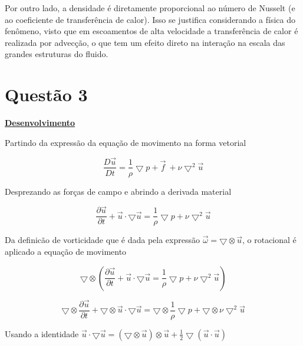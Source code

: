 \documentclass[12pt]{article}
\begin{document}
Por outro lado, a densidade é diretamente proporcional ao número de Nusselt (e ao coeficiente de transferência de calor). Isso se justifica considerando a física do fenômeno, visto que em escoamentos de alta velocidade a transferência de calor é realizada por advecção, o que tem um efeito direto na interação na escala das grandes estruturas do fluido.


\section*{Questão 3}

\textbf{\underline{Desenvolvimento}}


Partindo da expressão da equação de movimento na forma vetorial

\begin{equation}
	\frac{D\vec{u}}{Dt} = \frac{1}{\rho} \bigtriangledown p + \vec{f} \ + \nu \bigtriangledown^2 \vec{u}
\end{equation}


Desprezando as forças de campo e abrindo a derivada material


\begin{equation}
	\frac{\partial \vec{u}}{\partial t} + \vec{u} \cdot \bigtriangledown \vec{u} = \frac{1}{\rho} \bigtriangledown p + \nu \bigtriangledown^2 \vec{u}
\end{equation}


Da definicão de vorticidade que é dada pela expressão $\vec{\omega} = \bigtriangledown \otimes \vec{u}$, o rotacional é aplicado a equação de movimento

\begin{equation}
	\bigtriangledown \otimes \left( \frac{\partial \vec{u}}{\partial t} + \vec{u} \cdot \bigtriangledown \vec{u} = \frac{1}{\rho} \bigtriangledown p + \nu \bigtriangledown^2 \vec{u}\right) 
\end{equation}

\begin{equation}
	\bigtriangledown \otimes \frac{\partial \vec{u}}{\partial t} + \bigtriangledown \otimes \vec{u} \cdot \bigtriangledown \vec{u} = \bigtriangledown \otimes \frac{1}{\rho} \bigtriangledown p + \bigtriangledown \otimes \nu \bigtriangledown^2 \vec{u} 
\end{equation}

Usando a identidade $\vec{u} \cdot \bigtriangledown \vec{u} = (\bigtriangledown \otimes \vec{u}) \otimes \vec{u} + \frac{1}{2} \bigtriangledown(\vec{u}\cdot \vec{u})$
\end{document}

